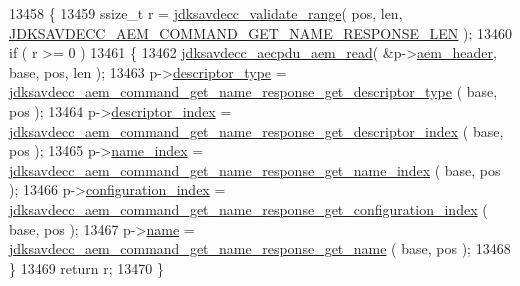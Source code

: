 \begin{DoxyCode}
13458 \{
13459     ssize\_t r = \hyperlink{group__util_ga9c02bdfe76c69163647c3196db7a73a1}{jdksavdecc\_validate\_range}( pos, len, 
      \hyperlink{group__command__get__name__response_ga1b946fd6efd4496498b2ea0c902bb167}{JDKSAVDECC\_AEM\_COMMAND\_GET\_NAME\_RESPONSE\_LEN} );
13460     \textcolor{keywordflow}{if} ( r >= 0 )
13461     \{
13462         \hyperlink{group__aecpdu__aem_gae2421015dcdce745b4f03832e12b4fb6}{jdksavdecc\_aecpdu\_aem\_read}( &p->\hyperlink{structjdksavdecc__aem__command__get__name__response_ae1e77ccb75ff5021ad923221eab38294}{aem\_header}, base, pos, len );
13463         p->\hyperlink{structjdksavdecc__aem__command__get__name__response_ab7c32b6c7131c13d4ea3b7ee2f09b78d}{descriptor\_type} = 
      \hyperlink{group__command__get__name__response_gadfcaac47791f78eeba3f25040e453265}{jdksavdecc\_aem\_command\_get\_name\_response\_get\_descriptor\_type}
      ( base, pos );
13464         p->\hyperlink{structjdksavdecc__aem__command__get__name__response_a042bbc76d835b82d27c1932431ee38d4}{descriptor\_index} = 
      \hyperlink{group__command__get__name__response_gace444f9fe92f80bf52c6d3d9199e7b38}{jdksavdecc\_aem\_command\_get\_name\_response\_get\_descriptor\_index}
      ( base, pos );
13465         p->\hyperlink{structjdksavdecc__aem__command__get__name__response_a898a74ada625e0b227dadb02901404e6}{name\_index} = 
      \hyperlink{group__command__get__name__response_ga4eaa5da4dc701f3f417f9608c87a662a}{jdksavdecc\_aem\_command\_get\_name\_response\_get\_name\_index}
      ( base, pos );
13466         p->\hyperlink{structjdksavdecc__aem__command__get__name__response_afaad1bd7c66f9611e134d8c5ce98f444}{configuration\_index} = 
      \hyperlink{group__command__get__name__response_ga02290070ea3ff9df2ea2276b2d105324}{jdksavdecc\_aem\_command\_get\_name\_response\_get\_configuration\_index}
      ( base, pos );
13467         p->\hyperlink{structjdksavdecc__aem__command__get__name__response_a7e615b51b7768e9b59bfa450051e0f8e}{name} = \hyperlink{group__command__get__name__response_ga21c97683a7ff367f24d96b99794c007c}{jdksavdecc\_aem\_command\_get\_name\_response\_get\_name}
      ( base, pos );
13468     \}
13469     \textcolor{keywordflow}{return} r;
13470 \}
\end{DoxyCode}


